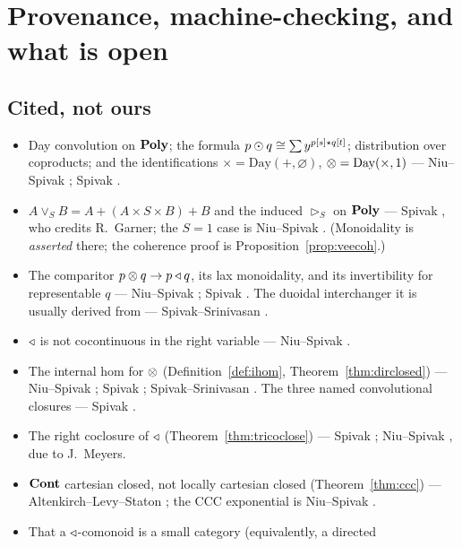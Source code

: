 \section{Provenance, machine-checking, and what is open}
\label{sec:provenance}

\subsection*{Cited, not ours}

\begin{itemize}[nosep]
\item Day convolution on $\mathbf{Poly}$; the formula
  $p\mathbin{\odot} q\cong\sum y^{p[s]\star q[t]}$; distribution over coproducts;
  and the identifications $\times=\mathrm{Day}(+,\varnothing)$,
  $\mathbin{\otimes}=\mathrm{Day}(\times,1)$ --- Niu--Spivak
  \cite[Prop.~3.79, eqs.~(3.80)--(3.81)]{NiuSpivak}; Spivak \cite{SpivakRef}.
\item $A\vee_S B=A+(A\times S\times B)+B$ and the induced $\rhd_S$ on $\mathbf{Poly}$ ---
  Spivak \cite[eqs.~(9),(12)]{SpivakRef}, who credits R.~Garner; the $S=1$ case
  is Niu--Spivak \cite[Ex.~3.82]{NiuSpivak}. (Monoidality is \emph{asserted}
  there; the coherence proof is Proposition~\ref{prop:veecoh}.)
\item The comparitor $p\mathbin{\otimes} q\to p\mathbin{\triangleleft} q$, its lax monoidality, and its
  invertibility for representable $q$ --- Niu--Spivak
  \cite[Ex.~6.84, Ex.~6.85, Prop.~6.87]{NiuSpivak}; Spivak
  \cite[eqs.~(32),(33)]{SpivakRef}. The duoidal interchanger it is usually
  derived from --- Spivak--Srinivasan \cite{SpivakSrinivasan}.
\item $\mathbin{\triangleleft}$ is not cocontinuous in the right variable --- Niu--Spivak
  \cite[Ex.~6.56]{NiuSpivak}.
\item The internal hom for $\mathbin{\otimes}$ (Definition~\ref{def:ihom},
  Theorem~\ref{thm:dirclosed}) --- Niu--Spivak \cite[Ex.~4.78,
  eq.~(4.79)]{NiuSpivak}; Spivak \cite[eq.~(44)]{SpivakRef}; Spivak--Srinivasan
  \cite[Prop.~2.8]{SpivakSrinivasan2305}. The three named convolutional closures
  --- Spivak \cite[eqs.~(38)--(40)]{SpivakRef}.
\item The right coclosure of $\mathbin{\triangleleft}$ (Theorem~\ref{thm:tricoclose}) --- Spivak
  \cite[eqs.~(68)--(69)]{SpivakRef}; Niu--Spivak \cite[Prop.~6.57]{NiuSpivak},
  due to J.~Meyers.
\item $\mathbf{Cont}$ cartesian closed, not locally cartesian closed
  (Theorem~\ref{thm:ccc}) --- Altenkirch--Levy--Staton \cite{ALS10}; the CCC
  exponential is Niu--Spivak \cite[Thm.~5.31]{NiuSpivak}.
\item That a $\mathbin{\triangleleft}$-comonoid is a small category (equivalently, a directed

\end{itemize}
